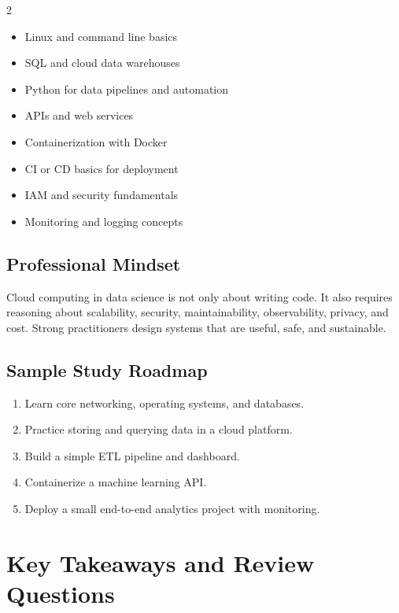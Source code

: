 \documentclass[11pt,a4paper]{article}
\begin{document}
\begin{multicols}{2}
\begin{itemize}[leftmargin=1.2em]
  \item Linux and command line basics
  \item SQL and cloud data warehouses
  \item Python for data pipelines and automation
  \item APIs and web services
  \item Containerization with Docker
  \item CI or CD basics for deployment
  \item IAM and security fundamentals
  \item Monitoring and logging concepts
\end{itemize}
\end{multicols}

\subsection{Professional Mindset}

\begin{conceptbox}
Cloud computing in data science is not only about writing code. It also requires reasoning about scalability, security, maintainability, observability, privacy, and cost. Strong practitioners design systems that are useful, safe, and sustainable.
\end{conceptbox}

\subsection{Sample Study Roadmap}

\begin{enumerate}[leftmargin=*]
  \item Learn core networking, operating systems, and databases.
  \item Practice storing and querying data in a cloud platform.
  \item Build a simple ETL pipeline and dashboard.
  \item Containerize a machine learning API.
  \item Deploy a small end-to-end analytics project with monitoring.
\end{enumerate}

\section{Key Takeaways and Review Questions}
\end{document}
